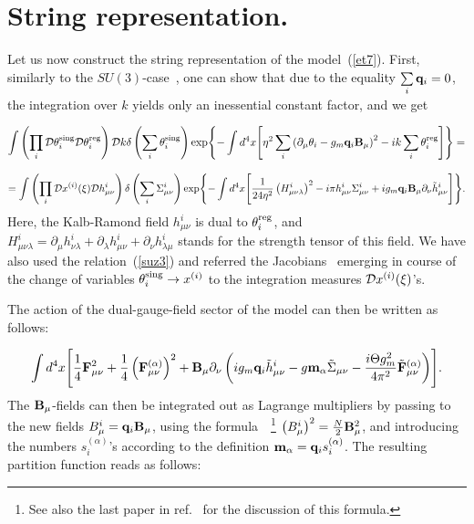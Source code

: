 \documentclass[a4paper,12pt]{article}
\begin{document}
\section{String representation.}

Let us now construct the string representation of the model~(\ref{et7}).
First, similarly to the $SU(3)$-case~\cite{su3, theta}, one can show that due to the equality $\sum\limits_{i}^{}{\bf q}_i=0$,
the integration over $k$ yields only an inessential constant factor, and we get

$$
\int\left(\prod\limits_{i}^{}
{\cal D}\theta_i^{\rm sing}
{\cal D}\theta_i^{\rm reg}\right) {\cal D}k\delta\left(\sum\limits_{i}^{}
\theta_i^{\rm sing}\right)
\exp\Biggl\{-\int d^4x\Biggl[\eta^2
\sum\limits_{i}^{}\left(\partial_\mu\theta_i-
g_m{\bf q}_i{\bf B}_\mu\right)^2-ik\sum\limits_{i}^{}\theta_i^{\rm reg}\Biggr]\Biggr\}=$$

$$
=\int\left(\prod\limits_{i}^{}{\cal D}x^{(i)}(\xi){\cal D}h_{\mu\nu}^i\right)
\delta\left(\sum\limits_{i}^{}\Sigma_{\mu\nu}^i\right)
\exp\Biggl\{-\int d^4x\Biggl[\frac{1}{24\eta^2}
\left(H_{\mu\nu\lambda}^i\right)^2-i\pi h_{\mu\nu}^i\Sigma_{\mu\nu}^i+
ig_m{\bf q}_i
{\bf B}_\mu\partial_\nu \tilde h_{\mu\nu}^i\Biggr]\Biggr\}.
$$
Here, the Kalb-Ramond field $h_{\mu\nu}^i$ is dual to $\theta_i^{\rm reg}$, and
$H_{\mu\nu\lambda}^i=\partial_\mu h_{\nu\lambda}^i+
\partial_\lambda h_{\mu\nu}^i+\partial_\nu h_{\lambda\mu}^i$ stands
for the strength tensor of this field.
We have also used the relation~(\ref{suz3})
and referred the Jacobians~\cite{polikarp} emerging in course of the change of variables $\theta_i^{\rm sing}\to x^{(i)}$
to the integration measures ${\cal D}x^{(i)}(\xi)$'s.

The action of the dual-gauge-field sector of the model can then be written as follows:

$$\int d^4x\Biggl[
\frac14{\bf F}_{\mu\nu}^2+\frac14\left({\bf F}_{\mu\nu}^{(\alpha)}\right)^2+
{\bf B}_\mu\partial_\nu\left(
ig_m{\bf q}_i\tilde h_{\mu\nu}^i-
g{\bf m}_\alpha\tilde\Sigma_{\mu\nu}-
\frac{i\Theta g_m^2}{4\pi^2}\tilde{\bf F}_{\mu\nu}^{(\alpha)}\right)\Biggr].$$
The ${\bf B}_\mu$-fields can then be integrated out as Lagrange multipliers by passing to the
new fields $B_\mu^i={\bf q}_i{\bf B}_\mu$, using the formula~\cite{group}~\footnote{See also the last paper in ref.~\cite{suNN}
for the discussion of this formula.} $\left(B_\mu^i\right)^2=\frac{N}{2}{\bf B}_\mu^2$,
and introducing the numbers $s_i^{(\alpha)}$'s
according to the definition ${\bf m}_\alpha={\bf q}_is_i^{(\alpha)}$. The resulting partition function reads
as follows:
\end{document}
